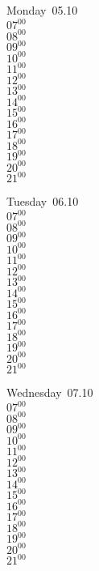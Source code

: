 \documentclass[11pt,a4paper]{book}\usepackage[]{graphicx}\usepackage[]{color}
\begin{document}
\begin{headerbox}
\end{headerbox}
\begin{weekdaybox}
  Monday~05.10\\
  { 
  \vfill
  $07^{00}$\\
$08^{00}$\\
$09^{00}$\\
$10^{00}$\\
$11^{00}$\\
$12^{00}$\\
$13^{00}$\\
$14^{00}$\\
$15^{00}$\\
$16^{00}$\\
$17^{00}$\\
$18^{00}$\\
$19^{00}$\\
$20^{00}$\\
$21^{00}$\\
  }
\end{weekdaybox}
\begin{weekdaybox}
  Tuesday~06.10\\
  { 
  \vfill
  $07^{00}$\\
$08^{00}$\\
$09^{00}$\\
$10^{00}$\\
$11^{00}$\\
$12^{00}$\\
$13^{00}$\\
$14^{00}$\\
$15^{00}$\\
$16^{00}$\\
$17^{00}$\\
$18^{00}$\\
$19^{00}$\\
$20^{00}$\\
$21^{00}$\\
  }
\end{weekdaybox}
\begin{weekdaybox}
  Wednesday~07.10\\
  { 
  \vfill
  $07^{00}$\\
$08^{00}$\\
$09^{00}$\\
$10^{00}$\\
$11^{00}$\\
$12^{00}$\\
$13^{00}$\\
$14^{00}$\\
$15^{00}$\\
$16^{00}$\\
$17^{00}$\\
$18^{00}$\\
$19^{00}$\\
$20^{00}$\\
$21^{00}$\\
  }
\end{weekdaybox}
\end{document}
